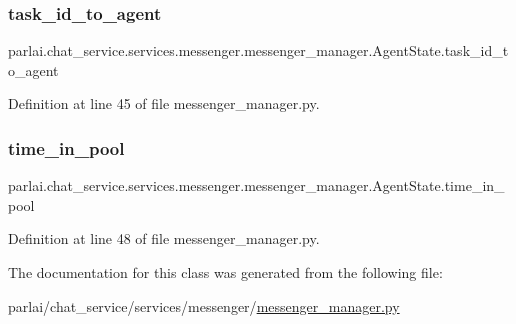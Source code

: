 \subsubsection{\texorpdfstring{task\+\_\+id\+\_\+to\+\_\+agent}{task\_id\_to\_agent}}
{\footnotesize\ttfamily parlai.\+chat\+\_\+service.\+services.\+messenger.\+messenger\+\_\+manager.\+Agent\+State.\+task\+\_\+id\+\_\+to\+\_\+agent}



Definition at line 45 of file messenger\+\_\+manager.\+py.

\mbox{\label{classparlai_1_1chat__service_1_1services_1_1messenger_1_1messenger__manager_1_1AgentState_a703c9594c7532b0badaef268001f1ba2}} 
\subsubsection{\texorpdfstring{time\+\_\+in\+\_\+pool}{time\_in\_pool}}
{\footnotesize\ttfamily parlai.\+chat\+\_\+service.\+services.\+messenger.\+messenger\+\_\+manager.\+Agent\+State.\+time\+\_\+in\+\_\+pool}



Definition at line 48 of file messenger\+\_\+manager.\+py.



The documentation for this class was generated from the following file\+:\begin{DoxyCompactItemize}
\item 
parlai/chat\+\_\+service/services/messenger/\hyperlink{messenger__manager_8py}{messenger\+\_\+manager.\+py}\end{DoxyCompactItemize}
